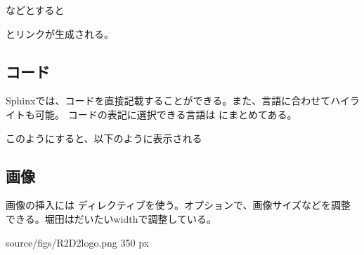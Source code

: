 \documentclass[letterpaper,10pt,dvipdfmx,report]{sphinxmanual}
\begin{document}
などとすると
\begin{quote}

{\hyperref[\detokenize{index::doc}]{}}
\end{quote}

とリンクが生成される。


\subsection{コード}
\label{\detokenize{sphinx:id8}}
Sphinxでは、コードを直接記載することができる。また、言語に合わせてハイライトも可能。
コードの表記に選択できる言語は  にまとめてある。

\begin{sphinxVerbatim}[commandchars=\\\{\}]
  

      

      
      
        
\end{sphinxVerbatim}

このようにすると、以下のように表示される

\begin{sphinxVerbatim}[commandchars=\\\{\}]
  

  
  
    
\end{sphinxVerbatim}


\subsection{画像}
\label{\detokenize{sphinx:id9}}
画像の挿入には  ディレクティブを使う。オプションで、画像サイズなどを調整できる。堀田はだいたいwidthで調整している。

\begin{sphinxVerbatim}[commandchars=\\\{\}]
  source/figs/R2D2\PYGZus{}logo.png
     350 px
\end{sphinxVerbatim}
\end{document}
